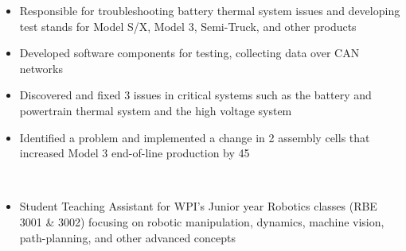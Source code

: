 
\begin{itemize}
    \item Responsible for troubleshooting battery thermal system issues and developing test stands for Model S/X, Model 3, Semi-Truck, and other products
    \item Developed software components for testing, collecting data over CAN networks
    \item Discovered and fixed 3 issues in critical systems such as the battery and powertrain thermal system and the high voltage system
    \item Identified a problem and implemented a change in 2 assembly cells that increased Model 3 end-of-line production by 45
\end{itemize}
\divider\\
\begin{itemize}
    \item Student Teaching Assistant for WPI’s Junior year Robotics classes (RBE 3001 \& 3002) focusing on robotic manipulation, dynamics, machine vision, path-planning, and other advanced concepts
\end{itemize}

